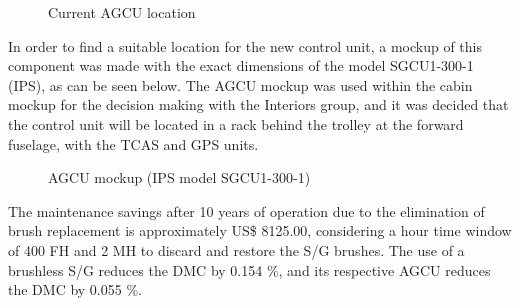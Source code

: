 \begin{figure}[H] %
\caption{Current AGCU location}
\label{fig:AGCU_Location}
\end{figure}

In order to find a suitable location for the new control unit, a mockup of this component was made with the exact dimensions of the model SGCU1-300-1 (IPS), as can be seen below. The AGCU mockup was used within the cabin mockup for the decision making with the Interiors group, and it was decided that the control unit will be located in a rack behind the trolley at the forward fuselage, with the TCAS and GPS units.

\begin{figure}[H] %
\caption{AGCU mockup (IPS model SGCU1-300-1)}
\label{fig:AGCU_mockup}
\end{figure}

The maintenance savings after 10 years of operation due to the elimination of brush replacement is approximately US\$ 8125.00, considering a hour time window of 400 FH and 2 MH to discard and restore the S/G brushes. The use of a brushless S/G reduces the DMC by 0.154 \%, and its respective AGCU reduces the DMC by 0.055 \%.
